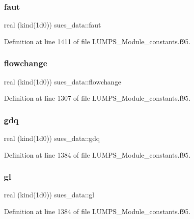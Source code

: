 \subsubsection{\texorpdfstring{faut}{faut}}
{\footnotesize\ttfamily real (kind(1d0)) sues\+\_\+data\+::faut}



Definition at line 1411 of file L\+U\+M\+P\+S\+\_\+\+Module\+\_\+constants.\+f95.

\mbox{\label{namespacesues__data_aafb79a529ff89254c1399e96d77a5fe0}} 
\subsubsection{\texorpdfstring{flowchange}{flowchange}}
{\footnotesize\ttfamily real (kind(1d0)) sues\+\_\+data\+::flowchange}



Definition at line 1307 of file L\+U\+M\+P\+S\+\_\+\+Module\+\_\+constants.\+f95.

\mbox{\label{namespacesues__data_a7ef0beda82e8b6758f37961b50f91b8a}} 
\subsubsection{\texorpdfstring{gdq}{gdq}}
{\footnotesize\ttfamily real (kind(1d0)) sues\+\_\+data\+::gdq}



Definition at line 1384 of file L\+U\+M\+P\+S\+\_\+\+Module\+\_\+constants.\+f95.

\mbox{\label{namespacesues__data_a4206a1be622f71796ce77db00ec3d459}} 
\subsubsection{\texorpdfstring{gl}{gl}}
{\footnotesize\ttfamily real (kind(1d0)) sues\+\_\+data\+::gl}



Definition at line 1384 of file L\+U\+M\+P\+S\+\_\+\+Module\+\_\+constants.\+f95.

